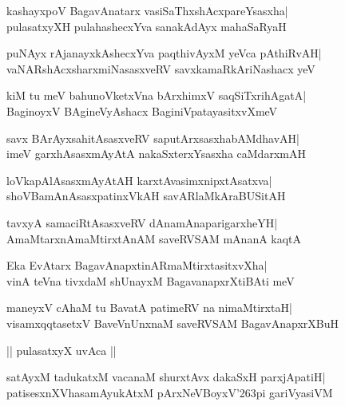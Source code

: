 \documentclass[twoside,12pt,openright]{book}
\def\S{\char'263}
\newcounter{shloka}[chapter]
\begin{document}
\begin{shloka}%
kashayxpoV BagavAnatarx vasiSaThxshAcxpareYsasxha|\\
pulasatxyXH pulahashecxYva sanakAdAyx mahaSaRyaH
\end{shloka}

\begin{shloka}%
puNAyx rAjanayxkAshecxYva paqthivAyxM yeVca pAthiRvAH|\\
vaNARshAcxsharxmiNasasxveRV savxkamaRkAriNashacx yeV
\end{shloka}

\begin{shloka}%
kiM tu meV bahunoVketxVna bArxhimxV saqSiTxrihAgatA|\\
BaginoyxV BAgineVyAshacx BaginiVpatayasitxvXmeV
\end{shloka}

\begin{shloka}%
savx BArAyxsahitAsasxveRV saputArxsasxhabAMdhavAH|\\
imeV garxhAsasxmAyAtA nakaSxterxYsasxha caMdarxmAH
\end{shloka}

\begin{shloka}%
loVkapAlAsasxmAyAtAH karxtAvasimxnipxtAsatxva|\\
shoVBamAnAsasxpatinxVkAH savARlaMkAraBUSitAH
\end{shloka}

\begin{shloka}%
tavxyA samaciRtAsasxveRV dAnamAnaparigarxheYH|\\
AmaMtarxnAmaMtirxtAnAM saveRVSAM mAnanA kaqtA
\end{shloka}

\begin{shloka}%
Eka EvAtarx BagavAnapxtinARmaMtirxtasitxvXha|\\
vinA teVna tivxdaM shUnayxM BagavanapxrXtiBAti meV
\end{shloka}

\begin{shloka}%
maneyxV cAhaM tu BavatA patimeRV na nimaMtirxtaH|\\
visamxqqtasetxV BaveVnUnxnaM saveRVSAM BagavAnapxrXBuH
\end{shloka}

\begin{center}
|| pulasatxyX uvAca ||
\end{center}
\begin{shloka}%
satAyxM tadukatxM vacanaM shurxtAvx dakaSxH parxjApatiH|\\
patisesxnXVhasamAyukAtxM pArxNeVBoyxV\S pi gariVyasiVM
\end{shloka}
\end{document}
